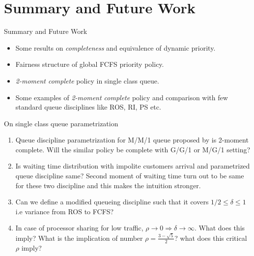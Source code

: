 \documentclass[compress, serif, onlymath, professionalfonts]{beamer}
\begin{document}
\section{Summary and Future Work}
\begin{frame}{Summary and Future Work}
\begin{itemize}
\item Some results on \textit{completeness} and equivalence of dynamic priority.
\item Fairness structure of global FCFS priority policy.
\item \textit{2-moment complete} policy in single class queue.
\item Some examples of \textit{2-moment complete} policy and comparison with few standard queue disciplines like ROS, RI, PS etc.
\end{itemize}
\begin{block}{On single class queue parametrization}
\begin{enumerate}\scriptsize
\item  Queue discipline parametrization for M/M/1 queue proposed by \cite{Q_parameter} is 2-moment complete.  Will the similar policy be complete with G/G/1 or M/G/1 setting?
\item Is waiting time distribution with impolite customers arrival and parametrized queue discipline same? Second moment of waiting time turn out to be same for these two discipline and this makes the intuition stronger.
\item Can we define a modified queueing discipline such that it covers $1/2 \le \delta \le 1$ i.e variance from ROS to FCFS?
\item In case of processor sharing for low traffic, $\rho \rightarrow 0 \Rightarrow \delta \rightarrow \infty$. What does this imply? What is the implication of number $\rho =\frac{3 - \sqrt{5}}{2}$? what does this critical $\rho$ imply?
\end{enumerate}
\end{block}
\end{frame}
\end{document}
